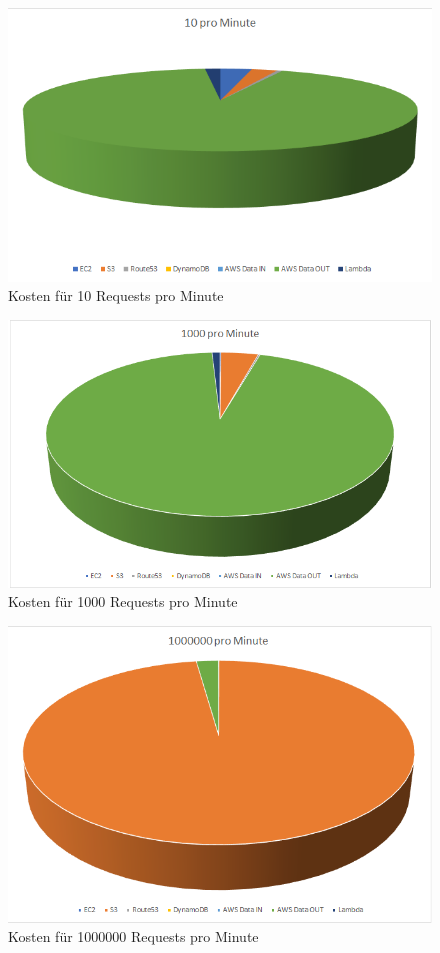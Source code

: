\documentclass[a4paper, 12pt]{scrreprt}
\renewcommand\_{\textunderscore\allowbreak}
\begin{document}
\begin{figure}[h]
\centering
\includegraphics[scale=1]{costs-10.png}
\caption{Kosten für 10 Requests pro Minute}
\end{figure}
\begin{figure}[h]
\centering
\includegraphics[scale=1]{costs-1000.png}
\caption{Kosten für 1000 Requests pro Minute}
\end{figure}
\begin{figure}[h]
\centering
\includegraphics[scale=1]{costs-1000000.png}
\caption{Kosten für 1000000 Requests pro Minute}
\end{figure}
\end{document}
